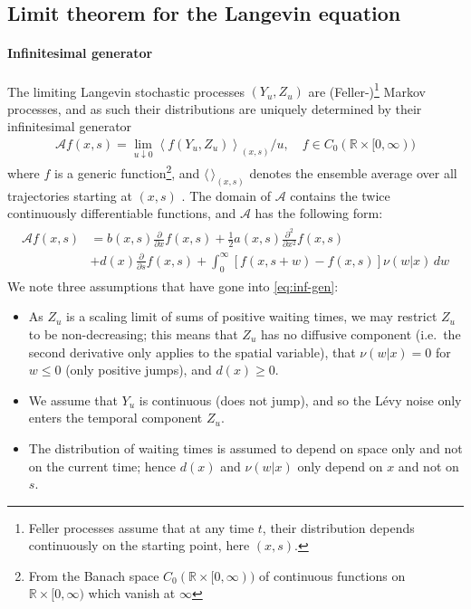 \documentclass[a4paper,12pt]{elsarticle}
\numberwithin{equation}{section}
\theoremstyle{plain}
\theoremstyle{definition}
\theoremstyle{remark}
\numberwithin{equation}{section}
\newcommand{\spc}{\mathbb R}
\newcommand{\spctim}{\spc \times [0,\infty)}
\newcommand{\1}{\mathbf 1}
\newcommand{\del}{\partial}
\begin{document}
\subsection{Limit theorem for the Langevin equation}
\label{subsec:convergence}
\paragraph{Infinitesimal generator}
The limiting Langevin stochastic processes $(Y_u,Z_u)$ are (Feller-)\footnote{Feller processes assume that at any time $t$, their distribution depends continuously on the starting point, here $(x,s)$.} Markov
processes, and as such their distributions
are uniquely determined by their infinitesimal generator
\begin{align}
\mathcal A f(x,s) = \lim_{u \downarrow 0}
\left \langle f(Y_u, Z_u)\right \rangle_{(x,s)} / u, 
\quad f \in C_0(\spctim)
\end{align}
where $f$ is a generic function\footnote{From the Banach space
$C_0(\spctim)$ of continuous  functions on $\spctim$ which vanish at $\infty$},
and $\langle \, \rangle_{(x,s)}$ denotes the ensemble average over all
trajectories starting at $(x,s)$ \cite{Applebaum}. The domain of $\mathcal A$ contains the twice
continuously differentiable functions, and $\mathcal A$ has the following
form:
\begin{align} \label{eq:inf-gen}
\begin{split}
\mathcal A f(x,s)
&= b(x,s)\frac{\del }{\del x} f(x,s)
+\frac{1}{2} a(x,s) \frac{\del^2}{\del x^2} f(x,s)\\
&+ d(x) \frac{\partial}{\partial s} f(x,s)
+ \int_0^\infty \left[f(x,s+w)-f(x,s)
\right] \nu(w|x)\, dw
\end{split}
\end{align}
We note three assumptions that have gone into \eqref{eq:inf-gen}: 
\begin{itemize}
\item
As $Z_u$ is a scaling limit of sums of positive waiting times,
we may restrict $Z_u$ to be non-decreasing; this means that
$Z_u$ has no diffusive component (i.e.\ the second derivative only applies to 
the spatial variable), that $\nu(w|x) = 0$ for $w \le 0$
(only positive jumps), and $d(x) \ge 0$.
\item
We assume that $Y_u$ is continuous (does not jump),
and so the L\'evy noise only enters the temporal component $Z_u$.
\item
The distribution of waiting times is assumed to depend on space only and not
on the current time; hence $d(x)$ and $\nu(w|x)$ only depend on $x$ and not on $s$.
\end{itemize}
\end{document}
